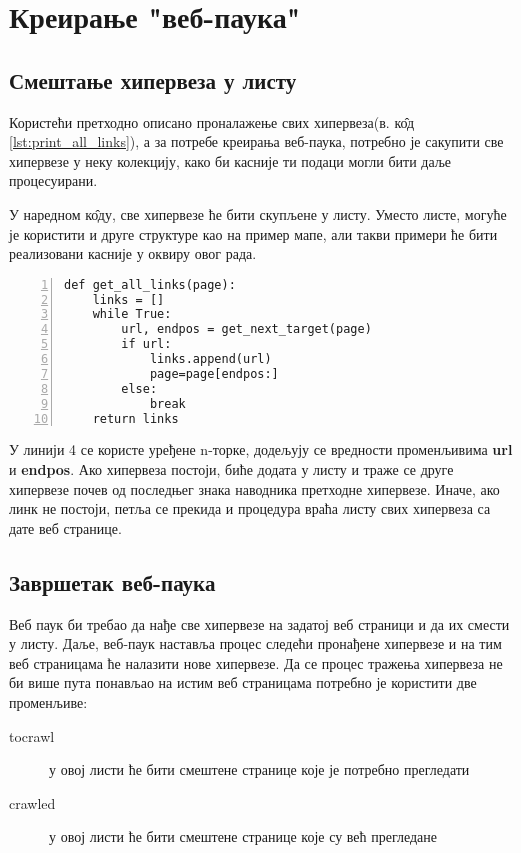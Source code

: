 \section{Креирање "веб-паука"}

\subsection{Смештање хипервеза у листу}

Користећи претходно описано проналажење свих хипервеза(в. к\^{о}д \ref{lst:print_all_links}), а за потребе креирања веб-паука, потребно је сакупити све хипервезе у неку колекцију, како би касније ти подаци могли бити даље процесуирани.

У наредном к\^{о}ду, све хипервезе ће бити скупљене у листу. Уместо листе, могуће је користити и друге структуре као на пример мапе, али такви примери ће бити реализовани касније у оквиру овог рада.

\begin{lstlisting}[caption=Процедура смештања свих хиперлинкова у листу, label={lst:getalllinks}, numbers=left]
def get_all_links(page):
    links = []
    while True:
        url, endpos = get_next_target(page)
        if url:
            links.append(url)
            page=page[endpos:]
        else:
            break
    return links
\end{lstlisting}

У линији 4 се користе уређене n-торке, додељују се вредности променљивима \textbf{url} и \textbf{endpos}. Ако хипервеза постоји, биће додата у листу и траже се друге хипервезе почев од последњег знака наводника претходне хипервезе. Иначе, ако линк не постоји, петља се прекида и процедура враћа листу свих хипервеза са дате веб странице.

\subsection{Завршетак веб-паука}

Веб паук би требао да нађе све хипервезе на задатој веб страници и да их смести у листу. Даље, веб-паук наставља процес следећи пронађене хипервезе и на тим веб страницама ће налазити нове хипервезе. Да се процес тражења хипервеза не би више пута понављао на истим веб страницама потребно је користити две променљиве:

\begin{description}
\item[tocrawl] у овој листи ће бити смештене странице које је потребно прегледати
\item[crawled] у овој листи ће бити смештене странице које су већ прегледане
\end{description}

